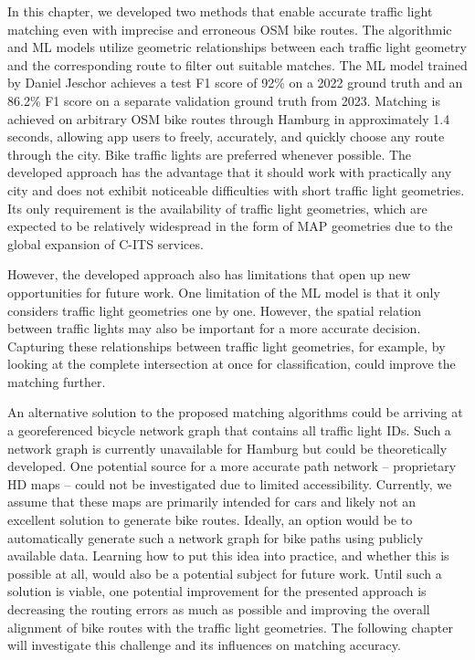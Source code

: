 In this chapter, we developed two methods that enable accurate traffic light matching even with imprecise and erroneous OSM bike routes. The algorithmic and ML models utilize geometric relationships between each traffic light geometry and the corresponding route to filter out suitable matches. The ML model trained by Daniel Jeschor \cite{jeschor_2022} achieves a test F1 score of 92\% on a 2022 ground truth and an 86.2\% F1 score on a separate validation ground truth from 2023. Matching is achieved on arbitrary OSM bike routes through Hamburg in approximately 1.4 seconds, allowing app users to freely, accurately, and quickly choose any route through the city. Bike traffic lights are preferred whenever possible. The developed approach has the advantage that it should work with practically any city and does not exhibit noticeable difficulties with short traffic light geometries. Its only requirement is the availability of traffic light geometries, which are expected to be relatively widespread in the form of MAP geometries due to the global expansion of C-ITS services.

However, the developed approach also has limitations that open up new opportunities for future work. One limitation of the ML model is that it only considers traffic light geometries one by one. However, the spatial relation between traffic lights may also be important for a more accurate decision. Capturing these relationships between traffic light geometries, for example, by looking at the complete intersection at once for classification, could improve the matching further.

An alternative solution to the proposed matching algorithms could be arriving at a georeferenced bicycle network graph that contains all traffic light IDs. Such a network graph is currently unavailable for Hamburg \cite{neuner_leitfaden_2020} but could be theoretically developed. One potential source for a more accurate path network -- proprietary HD maps -- could not be investigated due to limited accessibility. Currently, we assume that these maps are primarily intended for cars and likely not an excellent solution to generate bike routes. Ideally, an option would be to automatically generate such a network graph for bike paths using publicly available data. Learning how to put this idea into practice, and whether this is possible at all, would also be a potential subject for future work. Until such a solution is viable, one potential improvement for the presented approach is decreasing the routing errors as much as possible and improving the overall alignment of bike routes with the traffic light geometries. The following chapter will investigate this challenge and its influences on matching accuracy.